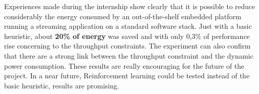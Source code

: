 Experiences made during the internship show clearly that it is possible to reduce considerably the energy consumed by an out-of-the-shelf embedded platform running a streaming application on a standard software stack. Just with a basic heuristic, about \textbf{20\% of energy} was saved and with only 0,3\% of performance rise concerning to the throughput constraints. The experiment can also confirm that there are a strong link between the throughput constraint and the dynamic power consumption. These results are really encouraging for the future of the project. In a near future, Reinforcement learning could be tested instead of the basic heuristic, results are promising.